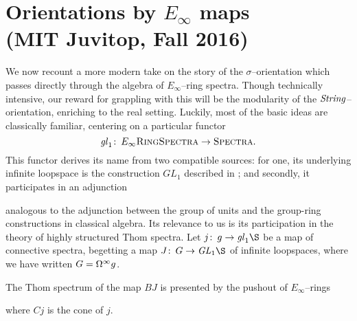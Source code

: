 \section[{Orientations by \texorpdfstring{\(E_\infty\)}{Eoo} maps}]{Orientations by \texorpdfstring{\(E_\infty\)}{Eoo} maps \\ (MIT Juvitop, Fall 2016)}\label{JuvitopTalkSection}

We now recount a more modern take on the story of the \(\sigma\)--orientation which passes directly through the algebra of \(E_\infty\)--ring spectra.  Though technically intensive, our reward for grappling with this will be the modularity of the \(\mathit{String}\)--orientation, enriching  to the real setting.  Luckily, most of the basic ideas are classically familiar, centering on a particular functor \[\mathit{gl}_1\colon\thinspace E_\infty\normalfont\textsc{RingSpectra} \to \normalfont\textsc{Spectra}.\]  This functor derives its name from two compatible sources: for one, its underlying infinite loopspace is the construction \(GL_1\) described in ; and secondly, it participates in an adjunction
\begin{center}
\end{center}
analogous to the adjunction between the group of units and the group-ring constructions in classical algebra.  Its relevance to us is its participation in the theory of highly structured Thom spectra.  Let \(j\co g \to \gl_1 \S\) be a map of connective spectra, begetting a map \(J\co G \to \GL_1 \S\) of infinite loopspaces, where we have written \(G = \Omega^\infty g\).
\begin{lemma}
The Thom spectrum of the map \(BJ\) is presented by the pushout of \(E_\infty\)--rings
\begin{center}
\end{center}
where \(Cj\) is the cone of \(j\).
\end{lemma}

